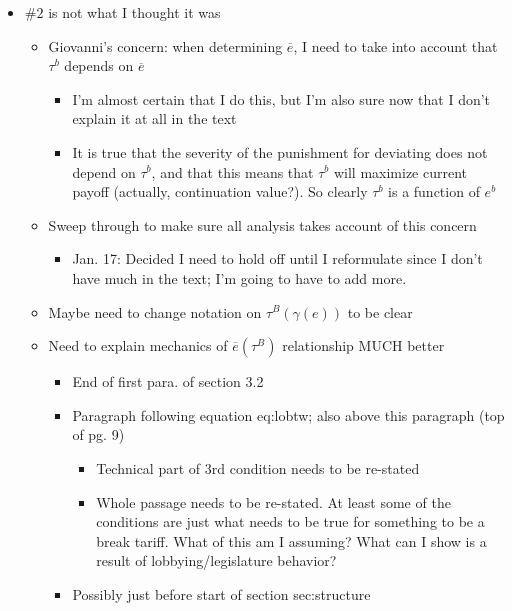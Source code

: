 \documentclass[12pt]{article}
\newcommand{\ov}{\overline}
\newcommand{\ga}{\gamma}
\begin{document}
\begin{itemize}
	\item $\#2$ is not what I thought it was
		\begin{itemize}
			\item Giovanni's concern: when determining $\ov{e}$, I need to take into account that $\tau^b$ depends on $\ov{e}$
				\begin{itemize}
					\item I'm almost certain that I do this, but I'm also sure now that I don't explain it at all in the text
					\item It is true that the severity of the punishment for deviating does not depend on $\tau^b$, and that this means that $\tau^b$ will maximize current payoff (actually, continuation value?). So clearly $\tau^b$ is a function of $e^b$
				\end{itemize}
			\item Sweep through to make sure all analysis takes account of this concern
				\begin{itemize}
					\item Jan. 17: Decided I need to hold off until I reformulate since I don't have much in the text; I'm going to have to add more.
				\end{itemize}
			\item Maybe need to change notation on $\tau^B(\ga(e))$ to be clear
			\item Need to explain mechanics of $\ov{e}(\tau^B)$ relationship MUCH better
				\begin{itemize}
					\item End of first para. of section 3.2
					\item Paragraph following equation eq:lobtw; also above this paragraph (top of pg. 9)
						\begin{itemize}
							\item Technical part of 3rd condition needs to be re-stated
							\item Whole passage needs to be re-stated. At least some of the conditions are just what needs to be true for something to be a break tariff. What of this am I assuming? What can I show is a result of lobbying/legislature behavior?
						\end{itemize}
					\item Possibly just before start of section sec:structure
				\end{itemize}
		\end{itemize}
	

\end{itemize}
\end{document}
